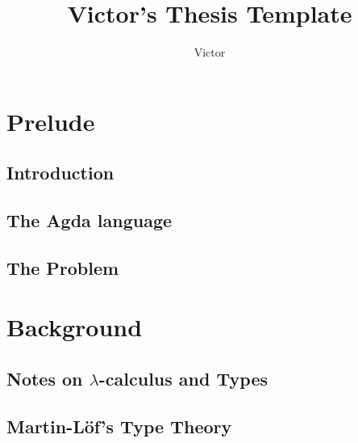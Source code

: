 \documentclass{report}
\title{Victor's Thesis Template}
\author{Victor}
\begin{document}
\maketitle
\tableofcontents

\theoremstyle{plain}
\newtheorem{thm}{Theorem}[chapter]
\newtheorem{crl}{Corolary}[chapter]
\newtheorem{prob}{Problem}[chapter]
\newtheorem{prop}{Proposition}[chapter]

\theoremstyle{definition}
\newtheorem{lemma}{Lemma}[chapter]
\newtheorem{mydef}{Definition}[chapter]
\newtheorem{notation}{Notation}[chapter]

\theoremstyle{remark}
\newtheorem{nota}{Note}[chapter]

\chapter{Prelude}
\label{chap:prelude}

  \section{Introduction}
  \label{sec:prelude:introduction}
  
  
  \section{The Agda language}
  \label{sec:prelude:agdalanguage}
  
  
  \section{The Problem}
  \label{sec:prelude:theproblem}
  
  
\chapter{Background}
\label{chap:background}


  \section{Notes on $\lambda$-calculus and Types}
  \label{sec:background:lambdacalculus}
  
  
  \section{Martin-Löf's Type Theory}
  \label{sec:background:martinlof}
  
  
\end{document}
